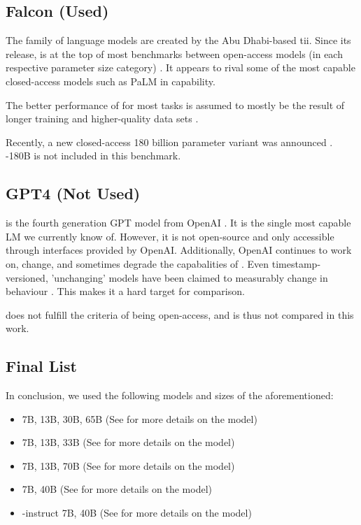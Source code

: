\subsection{Falcon (Used)}\label{sub:falcon}
The  \cite{zxhang_falcon_2023} family of language models are created by the Abu Dhabi-based \gls{tii}.
Since its release,  is at the top of most benchmarks between open-access models (in each respective parameter size category) \cite{zxhang_falcon_2023}.
It appears to rival some of the most capable closed-access models such as \gls{PaLM} in capability.

The better performance of  for most tasks is assumed to mostly be the result of longer training and higher-quality data sets \cite{zxhang_falcon_2023}.

Recently, a new closed-access 180 billion parameter  variant was announced \cite{tii_falcon180b_2023}. -180B is not included in this benchmark.


\subsection{GPT4 (Not Used)}\label{sub:GPT4}
 is the fourth generation \gls{GPT} model from \gls{OpenAI} \cite{openai_gpt4_2023}.
It is the single most capable \acrlong{LM} we currently know of.
However, it is not open-source and only accessible through interfaces provided by \gls{OpenAI}.
Additionally, \gls{OpenAI} continues to work on, change, and sometimes degrade the capabalities of  \cite{chen_how_2023}.
Even timestamp-versioned, 'unchanging' models have been claimed to measurably change in behaviour \cite{jw1224_hn}.
This makes it a hard target for comparison.

 does not fulfill the criteria of being open-access, and is thus not compared in this work.


\subsection{Final List}\label{sub:list}
In conclusion, we used the following models and sizes of the aforementioned:
\begin{itemize}
    \item {} 7B, 13B, 30B, 65B (See  for more details on the model)
    \item {} 7B, 13B, 33B (See  for more details on the model)
    \item {} 7B, 13B, 70B (See  for more details on the model)
    \item {} 7B, 40B (See  for more details on the model)
    \item {}-instruct 7B, 40B (See  for more details on the model)
\end{itemize}
